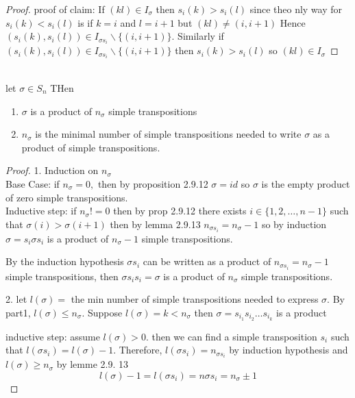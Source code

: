 \documentclass{article}
\begin{document}
\begin{proof}
    proof of claim: 
    If $(kl) \in I_{\sigma}$ then $s_i(k) >  s_i(l)$ since theo nly way for $s_i(k) < s_i(l)$ is if $k = i$ and $l = i+1$ but $(kl) \not = (i, i+1)$
    Hence $(s_i(k), s_i(l)) \in I_{\sigma s_i} \backslash \{(i, i+1)\}$. Similarly if $(s_i(k), s_i(l)) \in I_{\sigma s_i} \backslash \{(i, i+1)\}$ then $s_i(k) > s_i(l)$ so $(kl) \in I_{\sigma}$
\end{proof}
\begin{proposition}[2.9.14] \leavevmode \\ 
    let $\sigma \in S_n$ THen \begin{enumerate}
        \item $\sigma$ is a product of $n_{\sigma}$ simple transpositions
        \item $n_{\sigma}$ is the minimal number of simple transpositions needed to write $\sigma$ as a product of simple transpositions. 
        
    \end{enumerate}
    
\end{proposition}
\begin{proof}
    1. Induction on $n_{\sigma}$ \\
    Base Case: if $n_{\sigma} = 0, $ then by proposition 2.9.12 $\sigma = id$ so $\sigma $ is the empty product of zero simple transpositions. 
    \\ 
    Inductive step: if $n_{\sigma} != 0$ then by prop 2.9.12 there exists $i \in \{1, 2, \dots, n-1\}$ such that $\sigma(i) > \sigma(i+1)$ then by lemma 2.9.13 $n_{\sigma s_i} = n_{\sigma} - 1$ so by induction $\sigma = s_i \sigma s_i$ is a product of $n_{\sigma} - 1$ simple transpositions.

    By the induction hypothesis $\sigma s_i$ can be written as a product of $n_{\sigma s_i} = n_{\sigma} - 1$ simple transpositions, then $\sigma s_i s_i = \sigma $ is a product of $n_{\sigma}$ simple transpositions.


    2. let $l(\sigma) = $ the min number of simple transpositions needed to express $\sigma$. By part1, $l(\sigma) \leq n_{\sigma}$. Suppose $l(\sigma) = k < n_{\sigma}$ then $\sigma = s_{i_1} s_{i_2} \dots s_{i_k}$ is a product


    inductive step: assume $l(\sigma) > 0.$ then we can find a simple transposition $s_i$ such that $l(\sigma s_i)  = l(\sigma) - 1$. Therefore, $l(\sigma s_i) = n_{\sigma s_i}$ by induction hypothesis and $l(\sigma) \geq n_{\sigma}$ by lemme 2.9. 13
    $$l(\sigma ) - 1 = l(\sigma s_i) = n \sigma s_i = n_{\sigma} \pm 1$$
\end{proof}
\end{document}
